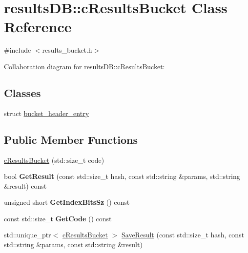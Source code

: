 \hypertarget{classresultsDB_1_1cResultsBucket}{\section{results\-D\-B\-:\-:c\-Results\-Bucket Class Reference}
\label{classresultsDB_1_1cResultsBucket}
}


{\ttfamily \#include $<$results\-\_\-bucket.\-h$>$}



Collaboration diagram for results\-D\-B\-:\-:c\-Results\-Bucket\-:
\subsection*{Classes}
\begin{DoxyCompactItemize}
\item 
struct \hyperlink{structresultsDB_1_1cResultsBucket_1_1bucket__header__entry}{bucket\-\_\-header\-\_\-entry}
\end{DoxyCompactItemize}
\subsection*{Public Member Functions}
\begin{DoxyCompactItemize}
\item 
\hyperlink{classresultsDB_1_1cResultsBucket_a959c37146bc088b2d8d69d51c63ae227}{c\-Results\-Bucket} (std\-::size\-\_\-t code)
\item 
\hypertarget{classresultsDB_1_1cResultsBucket_af6c2a4b7bc33ba06861ddb123a79f2be}{bool {\bfseries Get\-Result} (const std\-::size\-\_\-t hash, const std\-::string \&params, std\-::string \&result) const }\label{classresultsDB_1_1cResultsBucket_af6c2a4b7bc33ba06861ddb123a79f2be}

\item 
\hypertarget{classresultsDB_1_1cResultsBucket_a757169c7e12fe6db9f46ee889b34cd8b}{unsigned short {\bfseries Get\-Index\-Bits\-Sz} () const }\label{classresultsDB_1_1cResultsBucket_a757169c7e12fe6db9f46ee889b34cd8b}

\item 
\hypertarget{classresultsDB_1_1cResultsBucket_abf3099f9714a88cecc53f8211355e791}{const std\-::size\-\_\-t {\bfseries Get\-Code} () const }\label{classresultsDB_1_1cResultsBucket_abf3099f9714a88cecc53f8211355e791}

\item 
std\-::unique\-\_\-ptr$<$ \hyperlink{classresultsDB_1_1cResultsBucket}{c\-Results\-Bucket} $>$ \hyperlink{classresultsDB_1_1cResultsBucket_a280d00036ff59351e330b14eec2a070f}{Save\-Result} (const std\-::size\-\_\-t hash, const std\-::string \&params, const std\-::string \&result)
\end{DoxyCompactItemize}

